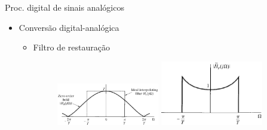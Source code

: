 \begin{slide}{Proc. digital de sinais anal\'ogicos}
\begin{itemize}
   \item Conversão digital-analógica
   \begin{itemize}
      \item Filtro de restauração 
      \begin{figure}
        \centering
         \includegraphics[width = 0.45\textwidth]{figs/da_conv1.eps}
        \includegraphics[width = 0.45\textwidth]{figs/da_conv2.eps}
      \end{figure}

   \end{itemize}
\end{itemize}
\end{slide}

